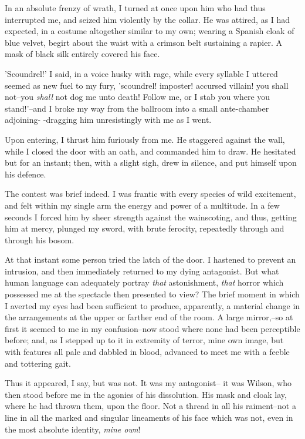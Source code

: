 \documentclass[12pt]{article}
\begin{document}
     In an absolute frenzy of wrath, I turned at once upon him who
had thus interrupted me, and seized him violently by the collar. 
He was attired, as I had expected, in a costume altogether similar
to my own; wearing a Spanish cloak of blue velvet, begirt about the
waist with a crimson belt sustaining a rapier.  A mask of black
silk entirely covered his face.

     'Scoundrel!' I said, in a voice husky with rage, while every
syllable I uttered seemed as new fuel to my fury, 'scoundrel!
imposter! accursed villain! you shall not--you \emph{shall} not dog me
unto death!  Follow me, or I stab you where you stand!'--and I
broke my way from the ballroom into a small ante-chamber adjoining-
-dragging him unresistingly with me as I went.

     Upon entering, I thrust him furiously from me.  He staggered
against the wall, while I closed the door with an oath, and
commanded him to draw.  He hesitated but for an instant; then, with
a slight sigh, drew in silence, and put himself upon his defence.

     The contest was brief indeed.  I was frantic with every
species of wild excitement, and felt within my single arm the
energy and power of a multitude.  In a few seconds I forced him by
sheer strength against the wainscoting, and thus, getting him at
mercy, plunged my sword, with brute ferocity, repeatedly through
and through his bosom.

     At that instant some person tried the latch of the door.  I
hastened to prevent an intrusion, and then immediately returned to
my dying antagonist.  But what human language can adequately
portray \emph{that} astonishment, \emph{that} horror which possessed me
at the spectacle then presented to view?  The brief moment
in which I averted my eyes had been sufficient to produce,
apparently, a material change in the arrangements at the upper or
farther end of the room.  A large mirror,--so at first it seemed to
me in my confusion--now stood where none had been perceptible
before; and, as I stepped up to it in extremity of terror, mine own
image, but with features all pale and dabbled in blood, advanced to
meet me with a feeble and tottering gait.

     Thus it appeared, I say, but was not.  It was my antagonist--
it was Wilson, who then stood before me in the agonies of his
dissolution.  His mask and cloak lay, where he had thrown them,
upon the floor.  Not a thread in all his raiment--not a line in all
the marked and singular lineaments of his face which was not, even
in the most absolute identity, \emph{mine own}!
\end{document}
